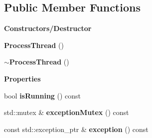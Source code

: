 \subsection*{Public Member Functions}
\begin{Indent}\textbf{ Constructors/\+Destructor}\par
\begin{DoxyCompactItemize}
\item 
\mbox{\label{classrev_1_1_process_thread_aea6865a31de55bfdc4f402b63255c05b}} 
{\bfseries Process\+Thread} ()
\item 
\mbox{\label{classrev_1_1_process_thread_a410b4d950888b04964cce3ece1d7ab2c}} 
{\bfseries $\sim$\+Process\+Thread} ()
\end{DoxyCompactItemize}
\end{Indent}
\begin{Indent}\textbf{ Properties}\par
\begin{DoxyCompactItemize}
\item 
\mbox{\label{classrev_1_1_process_thread_a64df56cb609577cf3ba2239059e7c941}} 
bool {\bfseries is\+Running} () const
\item 
\mbox{\label{classrev_1_1_process_thread_a60a8d79a7c52e9cb5995d00b2f763c5b}} 
std\+::mutex \& {\bfseries exception\+Mutex} () const
\item 
\mbox{\label{classrev_1_1_process_thread_a6a5c84519c3e4e65e2af3ad1fb6172c4}} 
const std\+::exception\+\_\+ptr \& {\bfseries exception} () const
\end{DoxyCompactItemize}
\end{Indent}

